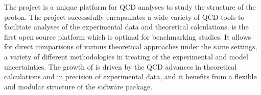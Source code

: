 
\label{sec:summary}
The \fitter project is a unique platform for QCD analyses to study the 
structure of the proton.
The project successfully encapsulates a wide variety
of QCD tools to facilitate analyses of the experimental data
and theoretical calculations. \fitter is the first open source platform which is optimal for benchmarking studies. It allows for direct comparisons of various theoretical approaches under the same settings, a variety of different methodologies in treating of the experimental and model uncertainties. The growth of \fitter is driven by the QCD advances in theoretical calculations and in precision of experimental data,  and it benefits from a flexible and modular structure of the software package.


